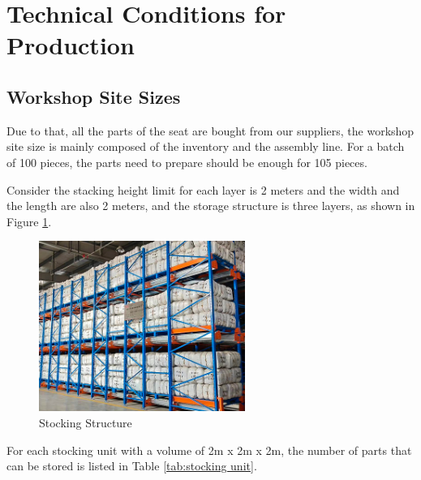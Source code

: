 \section{Technical Conditions for Production} \label{sec:TechCon}

\subsection{Workshop Site Sizes}
Due to that, all the parts of the seat are bought from our suppliers, the workshop site size is mainly composed of the inventory and the assembly line. For a batch of 100 pieces, the parts need to prepare should be enough for 105 pieces.

Consider the stacking height limit for each layer is 2 meters and the width and the length are also 2 meters, and the storage structure is three layers, as shown in Figure \ref{fig:stocking structure}.

\begin{figure}[!htp]
    \centering
    \includegraphics[width=0.6\textwidth]{images/stocking structure.jpg}
    \caption{Stocking Structure}
    \label{fig:stocking structure}
\end{figure}

For each stocking unit with a volume of 2m x 2m x 2m, the number of parts that can be stored is listed in Table \ref{tab:stocking unit}.

